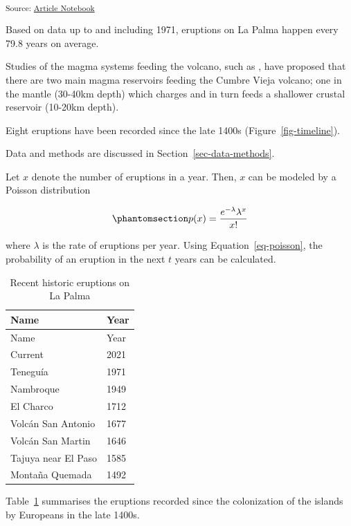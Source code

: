 \documentclass[
  12pt]{article}
\begin{document}
\textsubscript{Source:
\href{https://GeeMitchell.github.io/jsdss-manuscript/index.qmd.html}{Article
Notebook}}

Based on data up to and including 1971, eruptions on La Palma happen
every 79.8 years on average.

Studies of the magma systems feeding the volcano, such as
\citet{marrero2019}, have proposed that there are two main magma
reservoirs feeding the Cumbre Vieja volcano; one in the mantle (30-40km
depth) which charges and in turn feeds a shallower crustal reservoir
(10-20km depth).

Eight eruptions have been recorded since the late 1400s
(Figure~\ref{fig-timeline}).

Data and methods are discussed in Section~\ref{sec-data-methods}.

Let \(x\) denote the number of eruptions in a year. Then, \(x\) can be
modeled by a Poisson distribution

\begin{equation}\protect\phantomsection\label{eq-poisson}{
p(x) = \frac{e^{-\lambda} \lambda^{x}}{x !}
}\end{equation}

where \(\lambda\) is the rate of eruptions per year. Using
Equation~\ref{eq-poisson}, the probability of an eruption in the next
\(t\) years can be calculated.

\begin{longtable}[]{@{}ll@{}}
\caption{Recent historic eruptions on La
Palma}\label{tbl-history}\tabularnewline
\toprule\noalign{}
Name & Year \\
\midrule\noalign{}
\endfirsthead
\toprule\noalign{}
Name & Year \\
\midrule\noalign{}
\endhead
\bottomrule\noalign{}
\endlastfoot
Current & 2021 \\
Teneguía & 1971 \\
Nambroque & 1949 \\
El Charco & 1712 \\
Volcán San Antonio & 1677 \\
Volcán San Martin & 1646 \\
Tajuya near El Paso & 1585 \\
Montaña Quemada & 1492 \\
\end{longtable}

Table~\ref{tbl-history} summarises the eruptions recorded since the
colonization of the islands by Europeans in the late 1400s.
\end{document}
